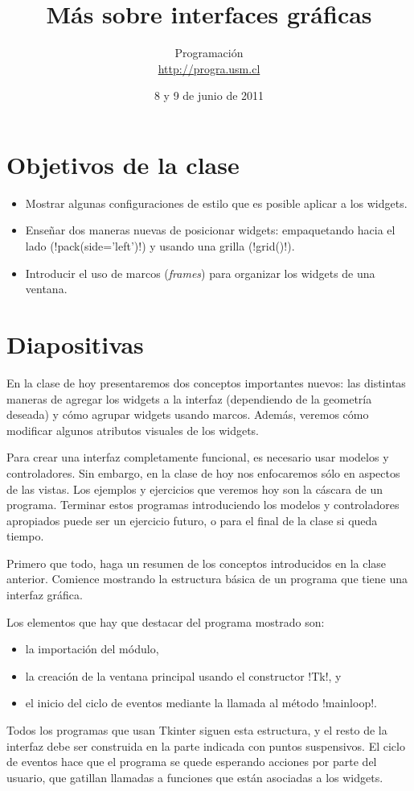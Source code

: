 \documentclass[10pt]{article}
\title{Más sobre interfaces gráficas}
\author{Programación \\ \url{http://progra.usm.cl}}
\date{8 y 9 de junio de 2011}
\begin{document}
  \maketitle

  \section*{Objetivos de la clase}
  \begin{itemize}
    \item Mostrar algunas configuraciones de estilo
      que es posible aplicar a los widgets.
    \item Enseñar dos maneras nuevas de posicionar widgets:
      empaquetando hacia el lado (\li!pack(side='left')!)
      y usando una grilla (\li!grid()!).
    \item Introducir el uso de marcos (\emph{frames})
      para organizar los widgets de una ventana.
  \end{itemize}

  \section*{Diapositivas}

  En la clase de hoy presentaremos dos conceptos importantes nuevos:
  las distintas maneras de agregar los widgets a la interfaz
  (dependiendo de la geometría deseada)
  y cómo agrupar widgets usando marcos.
  Además,
  veremos cómo modificar algunos atributos visuales de los widgets.

  Para crear una interfaz completamente funcional,
  es necesario usar modelos y controladores.
  Sin embargo,
  en la clase de hoy nos enfocaremos sólo
  en aspectos de las vistas.
  Los ejemplos y ejercicios que veremos hoy
  son la cáscara de un programa.
  Terminar estos programas introduciendo los modelos y controladores apropiados
  puede ser un ejercicio futuro, o para el final de la clase si queda tiempo.


  Primero que todo,
  haga un resumen de los conceptos introducidos en la clase anterior.
  Comience mostrando la estructura básica de un programa
  que tiene una interfaz gráfica.

  Los elementos que hay que destacar del programa mostrado son:
  \begin{itemize}
    \item la importación del módulo,
    \item la creación de la ventana principal
      usando el constructor \li!Tk!, y
    \item el inicio del ciclo de eventos
      mediante la llamada al método \li!mainloop!.
  \end{itemize}
  Todos los programas que usan Tkinter
  siguen esta estructura,
  y el resto de la interfaz debe ser construida
  en la parte indicada con puntos suspensivos.
  El ciclo de eventos
  hace que el programa se quede esperando
  acciones por parte del usuario,
  que gatillan llamadas a funciones
  que están asociadas a los widgets.
\end{document}
